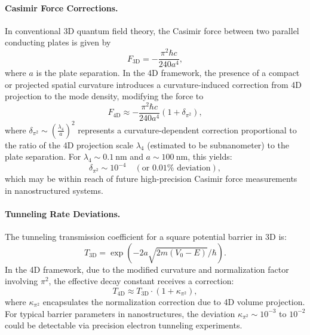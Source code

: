 \documentclass[12pt,a4paper]{article}
\begin{document}
\paragraph{Casimir Force Corrections.} In conventional 3D quantum field theory, the Casimir force between two parallel conducting plates is given by
\begin{equation}
F_{\text{3D}} = -\frac{\pi^2 \hbar c}{240 a^4},
\end{equation}
where \( a \) is the plate separation. In the 4D framework, the presence of a compact or projected spatial curvature introduces a curvature-induced correction from 4D projection to the mode density, modifying the force to
\begin{equation}
F_{\text{4D}} \approx -\frac{\pi^2 \hbar c}{240 a^4} \left( 1 + \delta_{\pi^2} \right),
\end{equation}
where \( \delta_{\pi^2} \sim \left( \frac{\lambda_4}{a} \right)^2 \) represents a curvature-dependent correction proportional to the ratio of the 4D projection scale \( \lambda_4 \) (estimated to be subnanometer) to the plate separation. For \( \lambda_4 \sim 0.1~\text{nm} \) and \( a \sim 100~\text{nm} \), this yields:
\begin{equation}
\delta_{\pi^2} \sim 10^{-4} \quad (\text{or } 0.01\% \text{ deviation}),
\end{equation}
which may be within reach of future high-precision Casimir force measurements in nanostructured systems.

\paragraph{Tunneling Rate Deviations.} The tunneling transmission coefficient for a square potential barrier in 3D is:
\begin{equation}
T_{\text{3D}} = \exp\left( -2a \sqrt{2m(V_0 - E)} / \hbar \right).
\end{equation}
In the 4D framework, due to the modified curvature and normalization factor involving \( \pi^2 \), the effective decay constant receives a correction:
\begin{equation}
T_{\text{4D}} \approx T_{\text{3D}} \cdot \left( 1 + \kappa_{\pi^2} \right),
\end{equation}
where \( \kappa_{\pi^2} \) encapsulates the normalization correction due to 4D volume projection. For typical barrier parameters in nanostructures, the deviation \( \kappa_{\pi^2} \sim 10^{-3} \) to \( 10^{-2} \) could be detectable via precision electron tunneling experiments.
\end{document}

